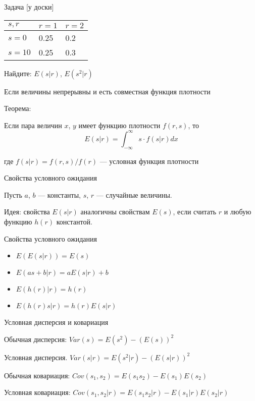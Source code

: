 \documentclass[russian,ignorenonframetext,]{beamer}
\begin{document}
\begin{frame}{Задача {[}у доски{]}}

\begin{longtable}[c]{@{}lll@{}}
\toprule
\(s,r\) & \(r=1\) & \(r=2\)\tabularnewline
\midrule
\endhead
\(s=0\) & 0.25 & 0.2\tabularnewline
\(s=10\) & 0.25 & 0.3\tabularnewline
\bottomrule
\end{longtable}

Найдите: \(E(s|r)\), \(E(s^2|r)\)

\end{frame}

\begin{frame}{Если величины непрерывны и есть совместная функция
плотности}

Теорема:

Если пара величин \(x\), \(y\) имеет функцию плотности \(f(r,s)\), то \[
E(s|r)=\int_{-\infty}^{\infty} s \cdot f(s|r) dx
\]

где \(f(s|r)=f(r,s)/f(r)\) --- условная функция плотности

\end{frame}

\begin{frame}{Свойства условного ожидания}

Пусть \(a\), \(b\) --- константы, \(s\), \(r\) --- случайные величины.

Идея: свойства \(E(s|r)\) аналогичны свойствам \(E(s)\), если считать
\(r\) и любую функцию \(h(r)\) константой.

\end{frame}

\begin{frame}{Свойства условного ожидания}

\begin{itemize}
\item
  \(E(E(s|r))=E(s)\)
\item
  \(E(as+b|r)=aE(s|r)+b\)
\item
  \(E(h(r)|r)=h(r)\)
\item
  \(E(h(r)s|r)=h(r)E(s|r)\)
\end{itemize}

\end{frame}

\begin{frame}{Условная дисперсия и ковариация}

Обычная дисперсия: \(Var(s)=E(s^2)-(E(s))^2\)

Условная дисперсия. \(Var(s|r)=E(s^2|r)-(E(s|r))^2\)

Обычная ковариация: \(Cov(s_1,s_2)=E(s_1 s_2)-E(s_1)E(s_2)\)

Условная ковариация: \(Cov(s_1,s_2|r)=E(s_1 s_2|r)-E(s_1|r)E(s_2|r)\)

\end{frame}
\end{document}
